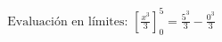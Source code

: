 \documentclass[preview]{standalone}
\begin{document}
\begin{align*}
\text{Evaluación en límites: } \left[\frac{x^3}{3}\right]_{0}^{5} = \frac{5^3}{3} - \frac{0^3}{3}
\end{align*}
\end{document}
